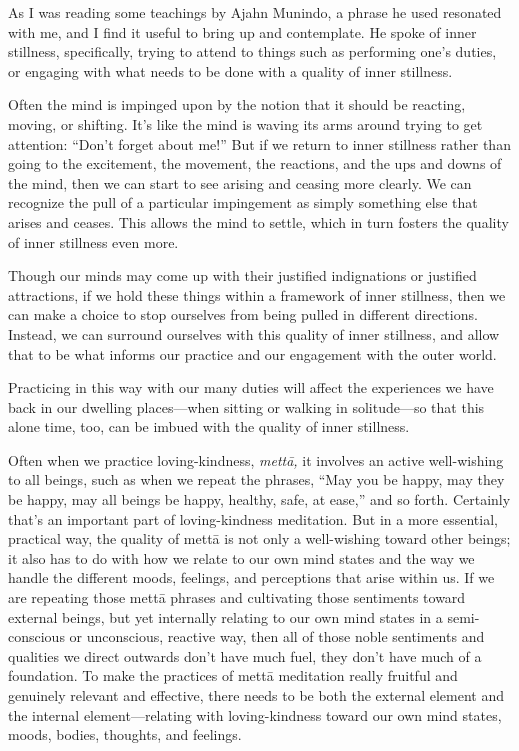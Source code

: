 
As I was reading some teachings by Ajahn Munindo, a phrase he used 
resonated with me, and I find it useful to bring up and contemplate. He 
spoke of inner stillness, specifically, trying to attend to things such 
as performing one's duties, or engaging with what needs to be done with 
a quality of inner stillness.

Often the mind is impinged upon by the notion that it should be 
reacting, moving, or shifting. It's like the mind is waving its arms 
around trying to get attention: ``Don't forget about me!'' But if we 
return to inner stillness rather than going to the excitement, the 
movement, the reactions, and the ups and downs of the mind, then we can 
start to see arising and ceasing more clearly. We can recognize the 
pull of a particular impingement as simply something else that arises 
and ceases. This allows the mind to settle, which in turn fosters the 
quality of inner stillness even more.

Though our minds may come up with their justified indignations or 
justified attractions, if we hold these things within a framework of 
inner stillness, then we can make a choice to stop ourselves from being 
pulled in different directions. Instead, we can surround ourselves with 
this quality of inner stillness, and allow that to be what informs our 
practice and our engagement with the outer world.

Practicing in this way with our many duties will affect the experiences 
we have back in our dwelling places---when sitting or walking in 
solitude---so that this alone time, too, can be imbued with the quality 
of inner stillness.


Often when we practice loving-kindness, \emph{mettā,} it involves an 
active well-wishing to all beings, such as when we repeat the phrases, 
``May you be happy, may they be happy, may all beings be happy, 
healthy, safe, at ease,'' and so forth. Certainly that's an important 
part of loving-kindness meditation. But in a more essential, practical 
way, the quality of mettā is not only a well-wishing toward other 
beings; it also has to do with how we relate to our own mind states and 
the way we handle the different moods, feelings, and perceptions that 
arise within us. If we are repeating those mettā phrases and 
cultivating those sentiments toward external beings, but yet internally 
relating to our own mind states in a semi-conscious or unconscious, 
reactive way, then all of those noble sentiments and qualities we 
direct outwards don't have much fuel, they don't have much of a 
foundation. To make the practices of mettā meditation really fruitful 
and genuinely relevant and effective, there needs to be both the 
external element and the internal element---relating with 
loving-kindness toward our own mind states, moods, bodies, thoughts, 
and feelings.

